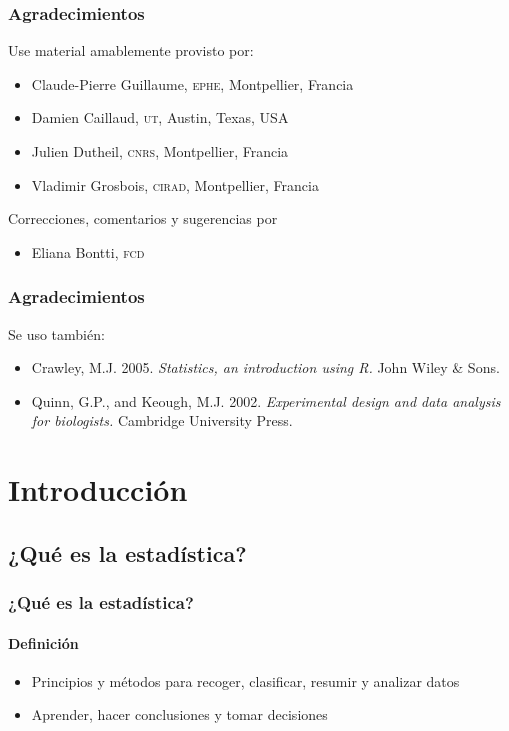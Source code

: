\documentclass[gray,handout,mathserif]{beamer}
\begin{document}
\begin{frame}[label=tnx1]
\frametitle{Agradecimientos}
Use material amablemente provisto por:
  \begin{itemize}
    \item Claude-Pierre Guillaume, \textsc{ephe}, Montpellier, Francia
    \item Damien Caillaud, \textsc{ut}, Austin, Texas, USA
    \item Julien Dutheil, \textsc{cnrs}, Montpellier, Francia
    \item Vladimir Grosbois, \textsc{cirad}, Montpellier, Francia
  \end{itemize}
  \medskip
Correcciones, comentarios y sugerencias por
  \begin{itemize}
     \item Eliana Bontti, \textsc{fcd}
  \end{itemize}
\end{frame}%

 
\begin{frame}[label=tnx2]
   \frametitle{Agradecimientos}
   Se uso tambi\'en:
    \begin{itemize}
      \item Crawley, M.J. 2005. \emph{Statistics, an introduction using R.} John Wiley \& Sons.
      \item Quinn, G.P., and Keough, M.J. 2002. \emph{Experimental design and data analysis for biologists.} Cambridge University Press. 
   \end{itemize}
\end{frame}%



\section{Introducci\'on}

\subsection[¿Qu\'e es?]{¿Qu\'e es la estad\'istica?}

\begin{frame}[label=def]
  \frametitle{¿Qu\'e es la estad\'istica?}
  \framesubtitle{Definici\'on}
  \begin{itemize}[<+-| handout:1>]
    \item Principios y m\'etodos para recoger, clasificar, resumir y analizar datos 
    \item Aprender, hacer conclusiones y tomar decisiones
  \end{itemize}
\end{frame}%
\end{document}
